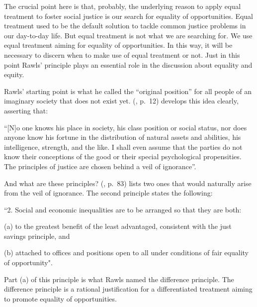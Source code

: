 The crucial point here is that, probably, the underlying reason to apply equal treatment to foster social justice is our search for equality of opportunities. Equal treatment used to be the default solution to tackle common justice problems in our day-to-day life. But equal treatment is not what we are searching for. We use equal treatment aiming for equality of opportunities. In this way, it will be necessary to discern when to make use of equal treatment or not. Just in this point Rawls' principle plays an essential role in the discussion about equality and equity.

Rawls' starting point is what he called the “original position” for all people of an imaginary society that does not exist yet.  (\citeyear{rawls:1971}, p.~12) develops this idea clearly, asserting that:
\begin{citacao}
    “[N]o one knows his place in society, his class position or social status, nor does anyone know his fortune in the distribution of natural assets and abilities, his intelligence, strength, and the like. I shall even assume that the parties do not know their conceptions of the good or their special psychological propensities. The principles of justice are chosen behind a veil of ignorance”.    
\end{citacao}

And what are these principles?  (\citeyear{rawls:1971}, p.~83) lists two ones that would naturally arise from the veil of ignorance. The second principle states the following:
\begin{citacao}
    “2. Social and economic inequalities are to be arranged so that they are both:
    
    \hspace{0.5cm} (a) to the greatest benefit of the least advantaged, consistent with the just savings principle, and
    
    \hspace{0.5cm} (b) attached to offices and positions open to all under conditions of fair equality of opportunity".
\end{citacao}
 
Part (a) of this principle is what Rawls named the difference principle. The difference principle is a rational justification for a differentiated treatment aiming to promote equality of opportunities.

